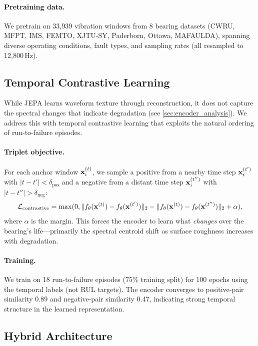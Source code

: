 \paragraph{Pretraining data.} We pretrain on 33{,}939 vibration windows from 8 bearing datasets (CWRU, MFPT, IMS, FEMTO, XJTU-SY, Paderborn, Ottawa, MAFAULDA), spanning diverse operating conditions, fault types, and sampling rates (all resampled to 12{,}800\,Hz).

\subsection{Temporal Contrastive Learning}
\label{sec:contrastive}

While JEPA learns waveform texture through reconstruction, it does not capture the spectral changes that indicate degradation (see \cref{sec:encoder_analysis}). We address this with temporal contrastive learning that exploits the natural ordering of run-to-failure episodes.

\paragraph{Triplet objective.} For each anchor window $\mathbf{x}_i^{(t)}$, we sample a positive from a nearby time step $\mathbf{x}_i^{(t')}$ with $|t - t'| < \delta_{\text{pos}}$ and a negative from a distant time step $\mathbf{x}_i^{(t'')}$ with $|t - t''| > \delta_{\text{neg}}$:
\begin{equation}
  \mathcal{L}_{\text{contrastive}} = \max(0, \| f_\theta(\mathbf{x}^{(t)}) - f_\theta(\mathbf{x}^{(t')}) \|_2 - \| f_\theta(\mathbf{x}^{(t)}) - f_\theta(\mathbf{x}^{(t'')}) \|_2 + \alpha),
  \label{eq:contrastive}
\end{equation}
where $\alpha$ is the margin. This forces the encoder to learn what \emph{changes} over the bearing's life---primarily the spectral centroid shift as surface roughness increases with degradation.

\paragraph{Training.} We train on 18 run-to-failure episodes (75\% training split) for 100 epochs using the temporal labels (not RUL targets). The encoder converges to positive-pair similarity 0.89 and negative-pair similarity 0.47, indicating strong temporal structure in the learned representation.

\subsection{Hybrid Architecture}
\label{sec:hybrid}

